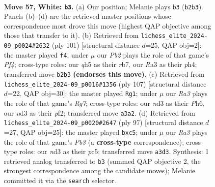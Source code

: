 \documentclass[11pt]{article}
\begin{document}
\clearpage

\begin{figure}[p]\centering
\begin{subfigure}{0.46\textwidth}\centering
\resizebox{\linewidth}{!}{%
\newchessgame
\chessboard[
  setfen={8/p5k1/1p6/5p1q/P1p5/R2n2P1/1P4K1/8 w - - 4 57},
  showmover=false,
  pgfstyle=straightmove, color=movearrow, markmove={b2-b3}
]}
\caption{}
\end{subfigure}\hfill
\begin{subfigure}{0.46\textwidth}\centering
\resizebox{\linewidth}{!}{%
\newchessgame
\chessboard[
  setfen={4k3/1R3p2/3p4/1P1P1p2/7P/4p1P1/5r2/6K1 b - - 0 51},
  showmover=false,
  pgfstyle=straightmove, color=movearrow, markmove={f5-f4}
]}
\caption{}
\end{subfigure}
\\[4pt]
\begin{subfigure}{0.46\textwidth}\centering
\resizebox{\linewidth}{!}{%
\newchessgame
\chessboard[
  setfen={8/7R/1kp4p/5pp1/8/1P2K2P/P4Pr1/8 b - - 1 54},
  showmover=false,
  pgfstyle=straightmove, color=movearrow, markmove={g2-g1}
]}
\caption{}
\end{subfigure}\hfill
\begin{subfigure}{0.46\textwidth}\centering
\resizebox{\linewidth}{!}{%
\newchessgame
\chessboard[
  setfen={8/8/1p6/2PP1pk1/1P6/3K2P1/r3N3/8 b - - 0 49},
  showmover=false,
  pgfstyle=straightmove, color=movearrow, markmove={b6-c5}
]}
\caption{}
\end{subfigure}
\caption{\textbf{Move 57, White: \texttt{b3}.} (a) Our position; Melanie plays \texttt{b3} (\texttt{b2b3}). Panels (b)--(d) are the retrieved master positions whose correspondence most drove this move (highest QAP objective among those that transfer to it). (b) Retrieved from \texttt{lichess\_elite\_2024-09\_p0024\#2632} (ply 101) [structural distance $d$=25, QAP obj=2]: the master played \texttt{f4}; under $\mu$ our \emph{Pb2} plays the role of that game's \emph{Pf4}; cross-type roles: our \emph{q}h5 as their \emph{r}b7, our \emph{R}a3 as their \emph{p}h4; transferred move \texttt{b2b3} \textbf{(endorses this move)}. (c) Retrieved from \texttt{lichess\_elite\_2024-09\_p0016\#1356} (ply 107) [structural distance $d$=22, QAP obj=30]: the master played \texttt{Rg1}; under $\mu$ our \emph{Ra3} plays the role of that game's \emph{Rg7}; cross-type roles: our \emph{n}d3 as their \emph{P}h6, our \emph{n}d3 as their \emph{p}f2; transferred move \texttt{a3a2}. (d) Retrieved from \texttt{lichess\_elite\_2024-09\_p0020\#2647} (ply 97) [structural distance $d$=27, QAP obj=25]: the master played \texttt{bxc5}; under $\mu$ our \emph{Ra3} plays the role of that game's \emph{Pb3} (a \textbf{cross-type} correspondence); cross-type roles: our \emph{n}d3 as their \emph{p}c5; transferred move \texttt{a3d3}. Synthesis: 1 retrieved analog transferred to \texttt{b3} (summed QAP objective 2, the strongest correspondence among the candidate moves); Melanie committed it via the \texttt{search} selector.}
\label{fig:thought-m112}
\end{figure}
\end{document}
